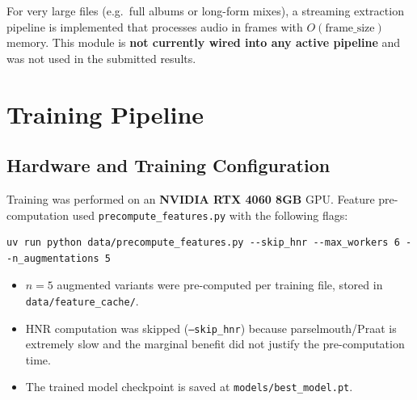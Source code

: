\documentclass[11pt,a4paper]{article}
\begin{document}
For very large files (e.g.\ full albums or long-form mixes), a streaming extraction pipeline is implemented that processes audio in frames with $O(\text{frame\_size})$ memory. This module is \textbf{not currently wired into any active pipeline} and was not used in the submitted results.


\section{Training Pipeline}

\subsection{Hardware and Training Configuration}

Training was performed on an \textbf{NVIDIA RTX 4060 8GB} GPU. Feature pre-computation used \texttt{precompute\_features.py} with the following flags:

\begin{verbatim}
uv run python data/precompute_features.py --skip_hnr --max_workers 6 --n_augmentations 5
\end{verbatim}

\begin{itemize}[nosep]
  \item $n=5$ augmented variants were pre-computed per training file, stored in \texttt{data/feature\_cache/}.
  \item HNR computation was skipped (\texttt{--skip\_hnr}) because parselmouth/Praat is extremely slow and the marginal benefit did not justify the pre-computation time.
  \item The trained model checkpoint is saved at \texttt{models/best\_model.pt}.
\end{itemize}
\end{document}
